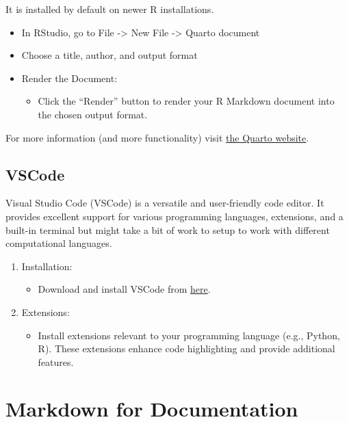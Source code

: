 \documentclass[
  letterpaper,
  DIV=11,
  numbers=noendperiod]{scrreprt}
\providecommand{\tightlist}{%
  \setlength{\itemsep}{0pt}\setlength{\parskip}{0pt}}\usepackage{longtable,booktabs,array}
\begin{document}
It is installed by default on newer R installations.

\begin{itemize}
\tightlist
\item
  In RStudio, go to File -\textgreater{} New File -\textgreater{} Quarto
  document
\item
  Choose a title, author, and output format
\item
  Render the Document:

  \begin{itemize}
  \tightlist
  \item
    Click the ``Render'' button to render your R Markdown document into
    the chosen output format.
  \end{itemize}
\end{itemize}

For more information (and more functionality) visit
\href{https://quarto.org/docs/get-started/hello/rstudio.html}{the Quarto
website}.

\subsection{VSCode}\label{vscode}

Visual Studio Code (VSCode) is a versatile and user-friendly code
editor. It provides excellent support for various programming languages,
extensions, and a built-in terminal but might take a bit of work to
setup to work with different computational languages.

\begin{enumerate}
\def\labelenumi{\arabic{enumi}.}
\tightlist
\item
  Installation:

  \begin{itemize}
  \tightlist
  \item
    Download and install VSCode from
    \href{https://code.visualstudio.com/}{here}.
  \end{itemize}
\item
  Extensions:

  \begin{itemize}
  \tightlist
  \item
    Install extensions relevant to your programming language (e.g.,
    Python, R). These extensions enhance code highlighting and provide
    additional features.
  \end{itemize}
\end{enumerate}

\section{Markdown for Documentation}\label{markdown-for-documentation}
\end{document}
